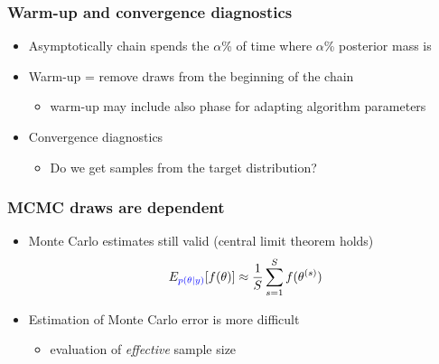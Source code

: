\documentclass[10pt]{beamer}
\begin{document}
\begin{frame}

\frametitle{ Warm-up and convergence diagnostics}

  \begin{itemize}
  \item Asymptotically chain spends the $\alpha$\% of time where
    $\alpha$\% posterior mass is
      \vspace{-.5\baselineskip}
    \item<3-> Warm-up = remove draws from the beginning of the chain
      \begin{itemize}
      \item warm-up may include also phase for adapting algorithm parameters
      \end{itemize}
    \item<4-> Convergence diagnostics
      \begin{itemize}
      \item Do we get samples from the target distribution?
      \end{itemize}
  \end{itemize}

\end{frame}

\begin{frame}

\frametitle{ MCMC draws are dependent}

  \begin{itemize}
    \item Monte Carlo estimates still valid (central limit theorem holds)
      \begin{align*}
        E_{\color{blue} p(\theta|y)}[f(\theta)] \approx \frac{1}{S} \sum_{s=1}^S f(\theta^{(s)})
      \end{align*}
    \item Estimation of Monte Carlo error is more difficult
      \begin{itemize}
      \item evaluation of {\it effective} sample size
      \end{itemize}
    \end{itemize}

\end{frame}
\end{document}
